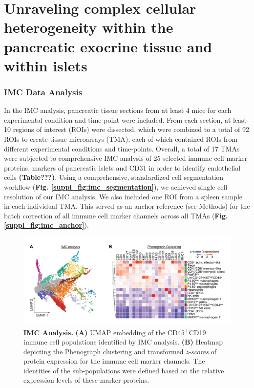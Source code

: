

\section{Unraveling complex cellular heterogeneity within the\\pancreatic exocrine tissue and within islets}
\subsubsection{IMC Data Analysis}
In the IMC analysis, pancreatic tissue sections from at least 4 mice for each experimental condition and time-point were included. From each section, at least 10 regions of interest (ROIs) were dissected, which were combined to a total of 92 ROIs to create tissue microarrays (TMA), each of which contained ROIs from different experimental conditions and time-points. Overall, a total of 17 TMAs were subjected to comprehensive IMC analysis of 25 selected immune cell marker proteins, markers of pancreatic islets and CD31 in order to identify endothelial cells \textbf{(Table???)}. Using a comprehensive, standardized cell segmentation workflow (\textbf{Fig. \ref{suppl_fig:imc_segmentation}}), we achieved single cell resolution of our IMC analysis. We also included one ROI from a spleen sample in each individual TMA. This served as an anchor reference (see Methods) for the batch correction of all immune cell marker channels across all TMAs (\textbf{Fig.\ref{suppl_fig:imc_anchor}}).\\

\begin{figure}[t]
\centering
\includegraphics[width=\linewidth]{Chapter4/Fig/F2-2-01.png}
\caption[res-imc]{\textbf{IMC Analysis.} \textbf{(A)} UMAP embedding of the CD45\textsuperscript{+}CD19\textsuperscript{-} immune cell populations identified by IMC analysis. \textbf{(B)}  Heatmap depicting the Phenograph clustering and transformed \textit{z-scores} of protein expression for the immune cell marker channels. The identities of the sub-populations were defined based on the relative expression levels of these marker proteins.}
\label{fig2-2}
\end{figure}

